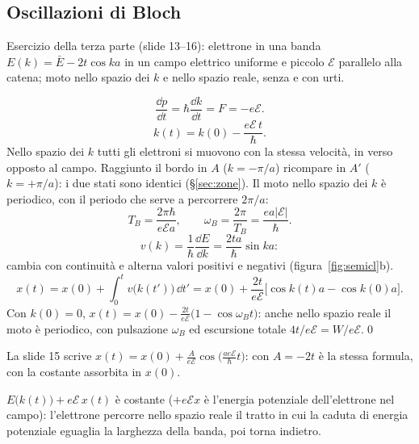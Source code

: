 \documentclass[11pt,a4paper]{article}
\begin{document}
\subsection{Oscillazioni di Bloch}\label{sec:blochosc}
Esercizio della terza parte (slide 13--16): elettrone in una banda $E(k)=\bar E-2t\cos ka$ in un campo elettrico uniforme e piccolo $\mathcal E$
parallelo alla catena; moto nello spazio dei $k$ e nello spazio reale, senza e con urti.
\begin{dimostrazione}
\[
\frac{\dd p}{\dd t}=\hbar\frac{\dd k}{\dd t}=F=-e\mathcal E .
\]
\[
k(t)=k(0)-\frac{e\mathcal E\,t}\hbar .
\]
Nello spazio dei $k$ tutti gli elettroni si muovono con la stessa velocità, in verso opposto al campo.
Raggiunto il bordo in $A$ ($k=-\pi/a$) ricompare in $A'$ ($k=+\pi/a$): i due stati sono identici (§\ref{sec:zone}). Il moto nello spazio dei $k$ è
periodico, con il periodo che serve a percorrere $2\pi/a$:
\[
T_B=\frac{2\pi\hbar}{e\mathcal E a},\qquad\omega_B=\frac{2\pi}{T_B}=\frac{ea|\mathcal E|}\hbar .
\]
\[
v(k)=\frac1\hbar\frac{\dd E}{\dd k}=\frac{2ta}\hbar\sin ka :
\]
cambia con continuità e alterna valori positivi e negativi (figura~\ref{fig:semicl}b).
\[
x(t)=x(0)+\int_0^tv\bigl(k(t')\bigr)\,\dd t'=x(0)+\frac{2t}{e\mathcal E}\bigl[\cos k(t)a-\cos k(0)a\bigr].
\]
Con $k(0)=0$, $x(t)=x(0)-\frac{2t}{e\mathcal E}\bigl(1-\cos\omega_Bt\bigr)$: anche nello spazio reale il moto è periodico, con pulsazione $\omega_B$ ed
escursione totale $4t/e\mathcal E=W/e\mathcal E$.\qed
\end{dimostrazione}
La slide 15 scrive $x(t)=x(0)+\frac A{e\mathcal E}\cos\bigl(\frac{ae\mathcal E}\hbar t\bigr)$: con $A=-2t$ è la stessa formula, con la costante
assorbita in $x(0)$.
\begin{risultato}
$E\bigl(k(t)\bigr)+e\mathcal E\,x(t)$ è costante ($+e\mathcal Ex$ è l'energia potenziale dell'elettrone nel campo): l'elettrone percorre nello spazio
reale il tratto in cui la caduta di energia potenziale eguaglia la larghezza della banda, poi torna indietro.
\end{risultato}
\end{document}
